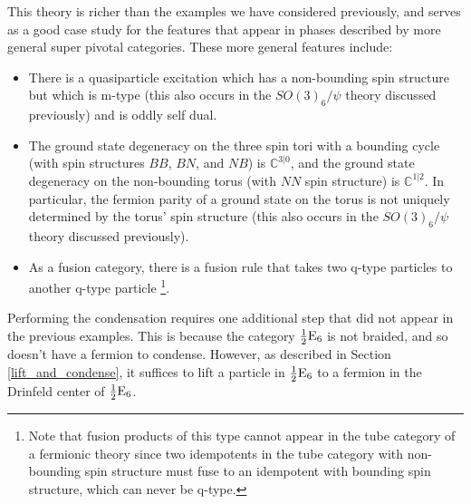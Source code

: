 This theory is richer than the examples we have considered previously, and serves as a good 
case study for the features that appear in phases described by more general super pivotal 
categories. 
These more general features include:
\begin{itemize}
\item There is a quasiparticle excitation which has a non-bounding spin structure but which is m-type 
(this also occurs in the $SO(3)_6/\psi$ theory discussed previously) and is oddly self dual.
\item The ground state degeneracy on the three spin tori with a bounding cycle (with spin 
structures $BB$, $BN$, and $NB$) is $\mathbb{C}^{3|0}$, and the ground state degeneracy on the 
non-bounding torus (with $NN$ spin structure) is $\mathbb{C}^{1|2}$.
In particular, the fermion parity of a ground state on the torus is not uniquely determined by 
the torus' spin structure (this also occurs in the $SO(3)_6/\psi$ theory discussed previously). 
 \item As a fusion category, there is a fusion rule that takes two q-type particles to another q-type particle
\footnote{Note that fusion products of this type cannot appear in the tube category of a fermionic theory since two idempotents in the tube category with non-bounding spin structure must fuse to an idempotent with bounding spin structure, which can never be q-type.
}. 
\end{itemize}

Performing the condensation requires one additional step that did not appear in the previous examples. 
This is because the category $\frac{1}{2}\text{E}_6$ is not braided, and so doesn't have a fermion to condense.
However, as described in Section \ref{lift_and_condense}, 
it suffices to lift a particle in $\frac{1}{2}\text{E}_6$ to a fermion in the Drinfeld center of $\frac{1}{2}\text{E}_6$.

